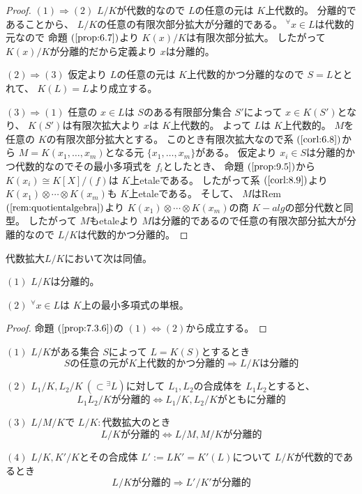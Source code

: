 \documentclass[../master_galois_theory]{subfiles}
\begin{document}
\begin{proof}
  $(1) \Rightarrow (2)$
  $L/K$が代数的なので $L$の任意の元は $K$上代数的。
  分離的であることから、 $L/K$の任意の有限次部分拡大が分離的である。
  ${}^\forall x \in L$は代数的元なので
  命題 $(\mathrm{\ref{prop:6.7}})$より $K(x)/K$は有限次部分拡大。
  したがって $K(x)/K$が分離的だから定義より $x$は分離的。

  $(2) \Rightarrow (3)$
  仮定より $L$の任意の元は $K$上代数的かつ分離的なので
  $S = L$ととれて、 $K(L) = L$より成立する。

  $(3) \Rightarrow (1)$
  任意の $x \in L$は $S$のある有限部分集合 $S'$によって
  $x \in K(S')$となり、 $K(S')$は有限次拡大より $x$は $K$上代数的。
  よって $L$は $K$上代数的。
  $M$を任意の $K$の有限次部分拡大とする。
  このとき有限次拡大なので系 $(\mathrm{\ref{corl:6.8}})$から
  $M = K(x_1 , \dots , x_m)$となる元 $\{ x_1 , \dots , x_m \}$がある。
  仮定より $x_i \in S$は分離的かつ代数的なのでその最小多項式を $f_i$としたとき、
  命題 $(\mathrm{\ref{prop:9.5}})$から
  $K(x_i) \cong K[X]/(f)$は $K$上\rm{etale}である。
  したがって系 $(\mathrm{\ref{corl:8.9}})$より
  $K(x_1) \otimes \cdots \otimes K(x_m)$も $K$上\rm{etale}である。
  そして、 $M$は\rm{Rem} $(\mathrm{\ref{rem:quotientalgebra}})$より
  $K(x_1) \otimes \cdots \otimes K(x_m)$の商 $K-alg$の部分代数と同型。
  したがって $M$も\rm{etale}より $M$は分離的であるので任意の有限次部分拡大が分離的なので
  $L/K$は代数的かつ分離的。
\end{proof}

\begin{corl} \label{corl:separable}
  代数拡大$L/K$において次は同値。

  $(1)$
  $L/K$は分離的。

  $(2)$
  ${}^\forall x \in L$は $K$上の最小多項式の単根。
\end{corl}

\begin{proof}
  命題 $(\mathrm{\ref{prop:7.3.6}})$の $(1) \Leftrightarrow (2)$から成立する。
\end{proof}

\begin{prop}
  $(1)$
  $L/K$がある集合 $S$によって $L = K(S)$とするとき
  \[
    Sの任意の元が K上代数的かつ分離的 \Rightarrow
    L/K は分離的
  \]

  $(2)$
  $L_1/K , L_2/K \  (\subset {}^\exists L)$に対して
  $L_1 , L_2$の合成体を $L_1 L_2$とすると、
  \[
  L_1 L_2 / Kが分離的 \Leftrightarrow L_1/K , L_2/Kがともに分離的
  \]

  $(3)$
  $L/M/K$で $L/K:$代数拡大のとき
  \[
  L/Kが分離的 \Leftrightarrow L/M , M/Kが分離的
  \]

  $(4)$
  $L/K , K'/K$とその合成体 $L' := L K' = K'(L)$について
  $L/K$が代数的であるとき
  \[
  L/Kが分離的 \Rightarrow L'/K'が分離的
  \]
\end{prop}
\end{document}
